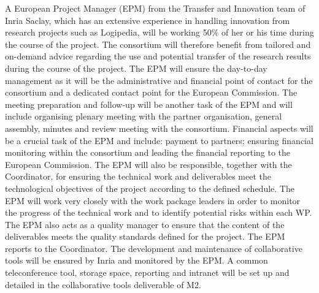 \begin{workpackage}[id=management,type=MGT,wphases=1-48,
  short=Management,
  title=Management,
  lead=Inr,InrRM=36,BirRM=1,InnRM=1,SacRM=1,TumRM=1,IrtRM=1,LeeRM=1]
\begin{tasklist}
  \begin{task}[id=admin,title=Administrative and Financial Management,lead=Inr,InrRM=24,wphases=1-48]
    A European Project Manager (EPM) from the Transfer and Innovation
    team of Inria Saclay, which has an extensive experience in handling
    innovation from research projects such as Logipedia, will be working
    50\% of her or his time during the course of the project.
     The
    consortium will therefore benefit from tailored and on-demand
    advice regarding the use and potential transfer of the research
    results during the course of the project.  The EPM will ensure the
    day-to-day management as it will be the administrative and
    financial point of contact for the consortium and a dedicated
    contact point for the European Commission. The meeting preparation
    and follow-up will be another task of the EPM and will include
    organising plenary meeting with the partner organisation, general
    assembly, minutes and review meeting with the consortium. Financial
    aspects will be a crucial task of the EPM and include: payment to
    partners; ensuring financial monitoring within the consortium and
    leading the financial reporting to the European Commission.  The
    EPM will also be responsible, together with the 
    Coordinator, for ensuring the technical work and deliverables meet
    the technological objectives of the project according to the
    defined schedule. The EPM will work very closely with the work
    package leaders in order to monitor the progress of the technical
    work and to identify potential risks within each WP. The EPM also
    acts as a quality manager to ensure that the content of the
    deliverables meets the quality standards defined for the
    project. The EPM reports to the Coordinator.  The
    development and maintenance of collaborative tools will be ensured
    by Inria and monitored by the EPM. A common teleconference tool,
    storage space, reporting and intranet will be set up and detailed
    in the collaborative tools deliverable of M2.
  \end{task}


\end{tasklist}
\end{workpackage}
